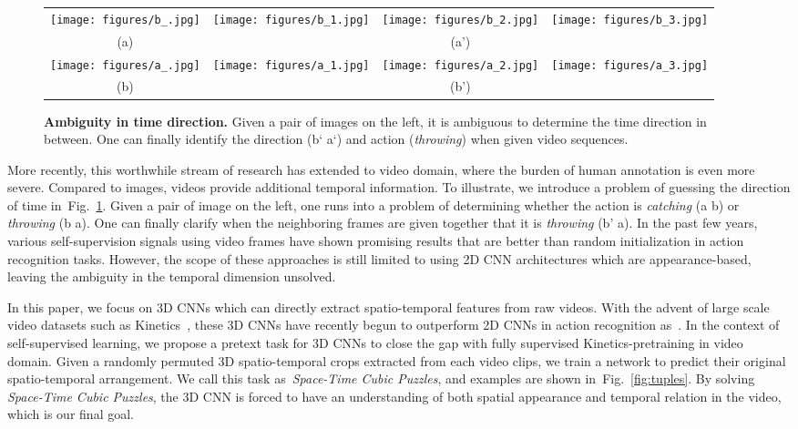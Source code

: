 \documentclass[letterpaper]{article} \usepackage{aaai19}  \usepackage{times}  \usepackage{helvet}  \usepackage{courier}  \usepackage{url}  \usepackage{graphicx}  \frenchspacing  \setlength{\pdfpagewidth}{8.5in}  \setlength{\pdfpageheight}{11in}
\newcommand{\figref}[1]{Fig.~\ref{#1}}
\begin{document}
\begin{figure}[t]
\begin{center}
\def\arraystretch{1.0}
\begin{tabular}{@{}c@{\hskip 0.005\textwidth} | @{\hskip 0.005\textwidth}c@{\hskip 0.005\textwidth} c@{\hskip 0.005\textwidth} c@{}}
\texttt{[image: figures/b\_.jpg]} &
\texttt{[image: figures/b\_1.jpg]} &
\texttt{[image: figures/b\_2.jpg]} &
\texttt{[image: figures/b\_3.jpg]} \\
(a) & & (a') & \\
\texttt{[image: figures/a\_.jpg]} &
\texttt{[image: figures/a\_1.jpg]} &
\texttt{[image: figures/a\_2.jpg]} &
\texttt{[image: figures/a\_3.jpg]} \\
(b) & & (b') & \\
\end{tabular}
\end{center}
\caption{\textbf{Ambiguity in time direction.} Given a pair of images on the left, it is ambiguous to determine the time direction in between. One can finally identify the direction (b`  a`) and action (\textit{throwing}) when given video sequences.}
\label{fig:teaser}
\end{figure}

More recently, this worthwhile stream of research has extended to video domain, where the burden of human annotation is even more severe. Compared to images, videos provide additional temporal information. To illustrate, we introduce a problem of guessing the direction of time in~\figref{fig:teaser}. Given a pair of image on the left, one runs into a problem of determining whether the action is \textit{catching} (a  b) or \textit{throwing} (b  a). One can finally clarify when the neighboring frames are given together that it is \textit{throwing} (b'  a). In the past few years, various self-supervision signals using video frames have shown promising results that are better than random initialization in action recognition tasks. However, the scope of these approaches is still limited to using 2D CNN architectures which are appearance-based, leaving the ambiguity in the temporal dimension unsolved. 

In this paper, we focus on 3D CNNs which can directly extract spatio-temporal features from raw videos. With the advent of large scale video datasets such as Kinetics~\cite{Kinetics}, these 3D CNNs have recently begun to outperform 2D CNNs in action recognition as~\cite{hara2018can}. In the context of self-supervised learning, we propose a pretext task for 3D CNNs to close the gap with fully supervised Kinetics-pretraining in video domain. Given a randomly permuted 3D spatio-temporal crops extracted from each video clips, we train a network to predict their original spatio-temporal arrangement. We call this task as~\textit{Space-Time Cubic Puzzles}, and examples are shown in~\figref{fig:tuples}. By solving \textit{Space-Time Cubic Puzzles}, the 3D CNN is forced to have an understanding of both spatial appearance and temporal relation in the video, which is our final goal.
\end{document}
